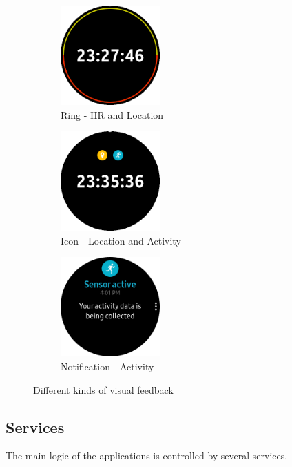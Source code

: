 \documentclass[conference, a4paper, 10pt, twocolumn]{IEEEtran}
\begin{document}
\begin{figure}[t!]
    \centering
    \begin{subfigure}[t]{0.33\textwidth}
        \centering
        \includegraphics[height=1.5in]{img/ringHR&Location.png}
        \caption{Ring - HR and Location}
        \label{fig:ringFeedback}
    \end{subfigure}%
    \begin{subfigure}[t]{0.33\textwidth}
        \centering
        \includegraphics[height=1.5in]{img/iconLocation&Activity.png}
        \caption{Icon - Location and Activity}
        \label{fig:iconFeedback}
    \end{subfigure}
    \begin{subfigure}[t]{0.33\textwidth}
        \centering
        \includegraphics[height=1.5in]{img/notificationActifity.png}
        \caption{Notification - Activity}
        \label{fig:notificationFeedback}
    \end{subfigure}
    \caption{Different kinds of visual feedback}
    \label{fig:visualFeedbackImage}
\end{figure}

\subsection{\textbf{Services}}\label{services}
The main logic of the applications is controlled by several services.
\end{document}
